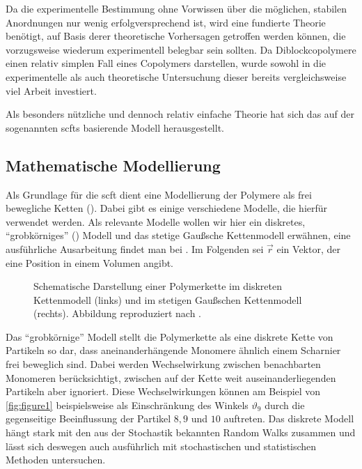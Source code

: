 Da die experimentelle Bestimmung ohne Vorwissen über die möglichen, stabilen Anordnungen nur wenig erfolgversprechend ist, wird eine fundierte Theorie benötigt, auf Basis derer theoretische Vorhersagen getroffen werden können, die vorzugsweise wiederum experimentell belegbar sein sollten.
Da Diblockcopolymere einen relativ simplen Fall eines Copolymers darstellen, wurde sowohl in die experimentelle als auch theoretische Untersuchung dieser bereits vergleichsweise viel Arbeit investiert.

Als besonders nützliche und dennoch relativ einfache Theorie hat sich das auf der sogenannten \acp{scft} basierende Modell herausgestellt.

\subsection*{Mathematische Modellierung} %
\label{sub:mathematische_modellierung}


Als Grundlage für die \acl{scft} dient eine Modellierung der Polymere als frei bewegliche Ketten ().
Dabei gibt es einige verschiedene Modelle, die hierfür verwendet werden.
Als relevante Modelle wollen wir hier ein diskretes, \enquote{grobkörniges} () Modell und das stetige Gaußsche Kettenmodell erwähnen, eine ausführliche Ausarbeitung findet man bei \textcites[Chapter 2]{Fredrickson:2006th}{HeBIS-11343507X}.
Im Folgenden sei $\vec{r}$ ein Vektor, der eine Position in einem Volumen angibt.

\begin{figure}[tb]
    \centering
        
    \caption[%
        Polymerkette in diskretem und Gaußschen Kettenmodell
    ]{%
        Schematische Darstellung einer Polymerkette im diskreten Kettenmodell (links) und im stetigen Gaußschen Kettenmodell (rechts).
        Abbildung reproduziert nach \cite[Figure 2.1 und 2.5]{Fredrickson:2006th}.
    }
    \label{fig:figure1}
\end{figure}

Das \enquote{grobkörnige} Modell stellt die Polymerkette als eine diskrete Kette von Partikeln so dar, dass aneinanderhängende Monomere ähnlich einem Scharnier frei beweglich sind.
Dabei werden Wechselwirkung zwischen benachbarten Monomeren berücksichtigt, zwischen auf der Kette weit auseinanderliegenden Partikeln aber ignoriert.
Diese Wechselwirkungen können am Beispiel von \autoref{fig:figure1} beispielsweise als Einschränkung des Winkels $\vartheta_9$ durch die gegenseitige Beeinflussung der Partikel $8, 9$ und $10$ auftreten.
Das diskrete Modell hängt stark mit den aus der Stochastik bekannten Random Walks zusammen und lässt sich deswegen auch ausführlich mit stochastischen und statistischen Methoden untersuchen.

